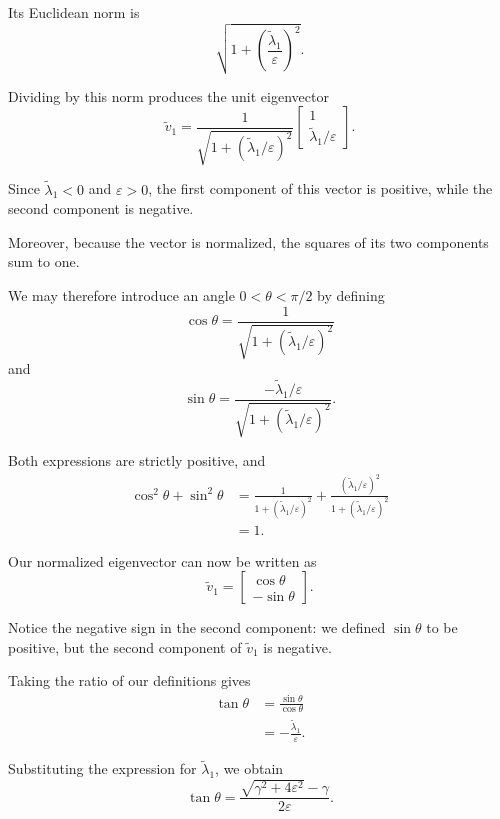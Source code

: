 \documentclass[14pt,letterpaper]{article}
\theoremstyle{plain}
\theoremstyle{definition}
\theoremstyle{remark}
\begin{document}
Its Euclidean norm is
\[
\sqrt{
1+\left(\frac{\widetilde\lambda_1}{\varepsilon}\right)^2
}.
\]

Dividing by this norm produces the unit eigenvector
\[
\boxed{
\widetilde v_1
=
\frac{1}{
\sqrt{1+(\widetilde\lambda_1/\varepsilon)^2}
}
\begin{bmatrix}
1\\
\widetilde\lambda_1/\varepsilon
\end{bmatrix}.
}
\]

Since $\widetilde\lambda_1<0$ and $\varepsilon>0$,
the first component of this vector is positive,
while the second component is negative.

Moreover, because the vector is normalized,
the squares of its two components sum to one.

We may therefore introduce an angle
$0<\theta<\pi/2$ by defining
\[
\boxed{
\cos\theta
=
\frac{1}{
\sqrt{1+(\widetilde\lambda_1/\varepsilon)^2}
}
}
\]
and
\[
\boxed{
\sin\theta
=
\frac{-\widetilde\lambda_1/\varepsilon}{
\sqrt{1+(\widetilde\lambda_1/\varepsilon)^2}
}.
}
\]

Both expressions are strictly positive, and
\[
\begin{aligned}
\cos^2\theta+\sin^2\theta
&=
\frac{1}{
1+(\widetilde\lambda_1/\varepsilon)^2
}
+
\frac{(\widetilde\lambda_1/\varepsilon)^2}{
1+(\widetilde\lambda_1/\varepsilon)^2
}\\
&=1.
\end{aligned}
\]



Our normalized eigenvector can now be written as
\[
\boxed{
\widetilde v_1=
\begin{bmatrix}
\cos\theta\\
-\sin\theta
\end{bmatrix}.
}
\]

Notice the negative sign in the second component:
we defined $\sin\theta$ to be positive, but the
second component of $\widetilde v_1$ is negative.

Taking the ratio of our definitions gives
\[
\begin{aligned}
\tan\theta
&=\frac{\sin\theta}{\cos\theta}\\
&=-\frac{\widetilde\lambda_1}{\varepsilon}.
\end{aligned}
\]

Substituting the expression for
$\widetilde\lambda_1$, we obtain
\[
\boxed{
\tan\theta
=
\frac{
\sqrt{\gamma^2+4\varepsilon^2}-\gamma
}{
2\varepsilon
}.
}
\]
\end{document}
